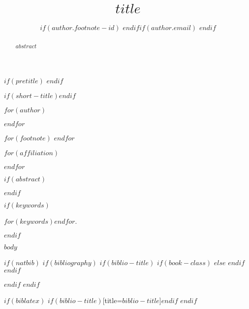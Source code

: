 \documentclass[$for(classoption)$$classoption$$sep$,$endfor$]{jdsart}
\begin{document}
\begin{frontmatter}
$if(pretitle)$
$endif$

\title{$title$}
$if(short-title)$$endif$

$for(author)$
\author[$author.marker$]{
  $if(author.footnote-id)$
  $endif$$if(author.email)$
  $endif$
}
$endfor$

$for(footnote)$
$endfor$

$for(affiliation)$
\address[$affiliation.marker$]{$if(affiliation.prefix)$$affiliation.prefix$, $endif$
  , }
$endfor$

$if(abstract)$
\begin{abstract}
$abstract$
\end{abstract}
$endif$

$if(keywords)$
\begin{keywords}
$for(keywords)$$endfor$.
\end{keywords}
$endif$

\end{frontmatter}

$body$

$if(natbib)$
$if(bibliography)$
$if(biblio-title)$
$if(book-class)$
\renewcommand\bibname{$biblio-title$}
$else$
\renewcommand\refname{$biblio-title$}
$endif$
$endif$


$endif$
$endif$

$if(biblatex)$
\printbibliography$if(biblio-title)$[title=$biblio-title$]$endif$
$endif$
\end{document}
